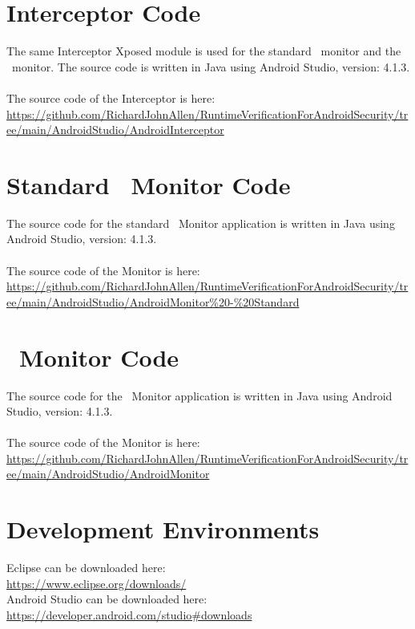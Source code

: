 
\section{Interceptor Code}
\label{app:InterceptorCode}

The same Interceptor Xposed module is used for the standard \RH\ monitor and the\\
\RRH\ monitor.  The source code is written in Java using Android Studio, version: 4.1.3.\\
\\
\noindent The source code of the Interceptor is here:\\
\noindent \url{https://github.com/RichardJohnAllen/RuntimeVerificationForAndroidSecurity/tree/main/AndroidStudio/AndroidInterceptor}

\section{Standard \RH\ Monitor Code}
\label{app:StandardRHMonitorCode}

The source code for the standard \RH\ Monitor application is written in Java using Android Studio, version: 4.1.3.\\
\\
\noindent The source code of the Monitor is here:\\
\noindent \url{https://github.com/RichardJohnAllen/RuntimeVerificationForAndroidSecurity/tree/main/AndroidStudio/AndroidMonitor\%20-\%20Standard}

\section{\RRH\ Monitor Code}
\label{app:MonitorCode}

The source code for the \RRH\ Monitor application is written in Java using Android Studio, version: 4.1.3.\\
\\
\noindent The source code of the Monitor is here:\\
\noindent \url{https://github.com/RichardJohnAllen/RuntimeVerificationForAndroidSecurity/tree/main/AndroidStudio/AndroidMonitor}

\section{Development Environments}

\noindent Eclipse can be downloaded here:\\
\noindent \url{https://www.eclipse.org/downloads/}\\

\noindent Android Studio can be downloaded here:\\
\noindent \url{https://developer.android.com/studio#downloads}\\
